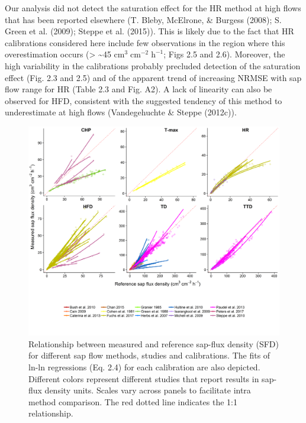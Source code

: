 \documentclass[11pt,twoside]{reedthesis}
\begin{document}
Our analysis did not detect the saturation effect for the HR method at
high flows that has been reported elsewhere (T. Bleby, McElrone, \&
Burgess (2008); S. Green et al. (2009); Steppe et al. (2015)). This is
likely due to the fact that HR calibrations considered here include few
observations in the region where this overestimation occurs
(\textgreater{} \textasciitilde{}45
\(\text{cm}^3\; \text{cm}^{-2}\; \text{h}^{-1}\); Figs 2.5 and 2.6).
Moreover, the high variability in the calibrations probably precluded
detection of the saturation effect (Fig. 2.3 and 2.5) and of the
apparent trend of increasing NRMSE with sap flow range for HR (Table 2.3
and Fig. A2). A lack of linearity can also be observed for HFD,
consistent with the suggested tendency of this method to underestimate
at high flows (Vandegehuchte \& Steppe (2012c)).\par
\begin{figure}[p]

{\centering \includegraphics[width=1\linewidth]{figure/CH2/figure-density} 

}

\caption[Relationship between measured and reference sap-flux density (SFD) for different sap flow methods, studies and calibrations.]{Relationship between measured and reference sap-flux density (SFD) for different sap flow methods, studies and calibrations. The fits of ln-ln regressions (Eq. 2.4) for each calibration are also depicted. Different colors represent different studies that report results in sap-flux density units. Scales vary across panels to facilitate intra method comparison. The red dotted line indicates the 1:1 relationship.}\label{fig:ch2fig5}
\end{figure}
\end{document}

